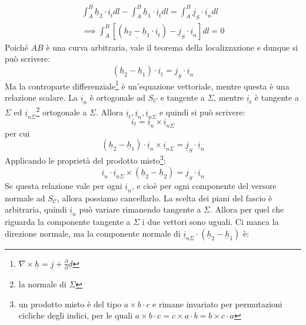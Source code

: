 \documentclass{book}
\begin{document}
        \begin{align}
            \int_{A} ^{B} \underline{h}_{2} \cdot \underline{i}_{t}dl - \int_{A} ^{B} \underline{h}_{1} \cdot \underline{i}_{t}dl = \int_{A} ^{B} \underline{j}_{S} \cdot \underline{i}_{n} dl \\ \implies
            \int_{A} ^{B} [(\underline{h_{2}-\underline{h}_{1}}\cdot \underline{i}_{t})-\underline{j}_{S}\cdot \underline{i}_{n}]dl = 0
        \end{align}
        Poiché $AB$ è una curva arbitraria, vale il teorema della localizzazione e dunque si può scrivere:
        \begin{equation}
            (\underline{h}_{2}-\underline{h}_{1}) \cdot \underline{i}_{t} = \underline{j}_{S} \cdot \underline{i}_{n}
        \end{equation}
        Ma la controparte differenziale\footnote{$\nabla \times \underline{h} = \underline{j} + \frac{\partial}{\partial} \underline{d}$} è un'equazione vettoriale, mentre questa è una relazione scalare. La $\underline{i}_{n}$ è ortogonale ad $S_{C}$ e tangente a $\Sigma$, mentre $\underline{i}_{t}$ è tangente a $\Sigma$ ed $\underline{i}_{n\Sigma}$\footnote{la normale di $\Sigma$} ortogonale a $\Sigma$. Allora $\underline{i}_{t}, \underline{i}_{n}, \underline{i}_{n\Sigma}$ e quindi si può scrivere:
        \begin{equation}
            i_{t} = \underline{i}_{n} \times \underline{i}_{n\Sigma}
        \end{equation}
        per cui
        \begin{equation}
            (\underline{h}_{2}-\underline{h}_{1}) \cdot \underline{i}_{n} \times \underline{i}_{n\Sigma} = \underline{j}_{S} \cdot \underline{i}_{n}
        \end{equation}
        Applicando le proprietà del prodotto misto\footnote{un prodotto misto è del tipo $a \times b \cdot c$ e rimane invariato per permutazioni cicliche degli indici, per le quali $a \times b \cdot c = c \times a \cdot b = b \times c \cdot a$}:
        \begin{equation}
            \underline{i}_{n} \cdot \underline{i}_{n \Sigma} \times (\underline{h}_{2}-\underline{h}_{2}) = \underline{j}_{S} \cdot \underline{i}_{n}
        \end{equation}
        Se questa relazione vale per ogni $\underline{i}_{n}$, e cioè per ogni componente del versore normale ad $S_{\mathcal{C}}$, allora possiamo cancellarlo. La scelta dei piani del fascio è arbitraria, quindi $\underline{i}_{n}$ può variare rimanendo tangente a $\Sigma$. Allora per quel che riguarda la componente tangente a $\Sigma$ i due vettori sono uguali. Ci manca la direzione normale, ma la componente normale di $\underline{i}_{n\Sigma} \cdot (\underline{h}_{2}-\underline{h}_{1})$ è:
\end{document}
